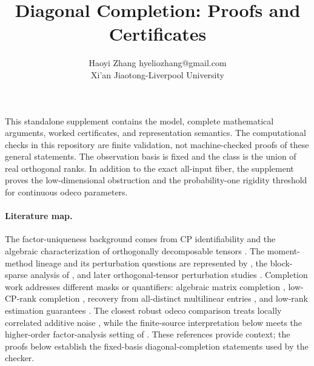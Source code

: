 \documentclass[11pt,twoside]{article}
\begin{document}
\title{Diagonal Completion: Proofs and Certificates}
\author{\name Haoyi Zhang \email hyeliozhang@gmail.com \\
\addr Xi'an Jiaotong-Liverpool University}
\maketitle
This standalone supplement contains the model, complete mathematical arguments,
worked certificates, and representation semantics. The computational checks in
this repository are finite validation, not machine-checked proofs of these general statements.
The observation basis is fixed and the class is the union of real orthogonal ranks.  In addition to the exact all-input fiber, the supplement proves the low-dimensional obstruction and the probability-one rigidity threshold for continuous odeco parameters.

\paragraph{Literature map.}
The factor-uniqueness background comes from CP identifiability and the algebraic
characterization of orthogonally decomposable tensors
\citep{bhaskara2014,boralevi2017,robeva2016,koiran2021}.
The moment-method lineage and its perturbation questions are represented by
\citet{anandkumar2014}, the block-sparse analysis of \citet{anandkumar2016},
and later orthogonal-tensor perturbation studies
\citep{luo2021,xia2019,auddy2023,yuan2026}.
Completion work addresses different masks or quantifiers: algebraic matrix
completion \citep{kiraly2015}, low-CP-rank completion
\citep{ashraphijuo2017,haselby2024}, recovery from all-distinct multilinear
entries \citep{schramm2015}, and low-rank estimation guarantees
\citep{tongwu2026}. The closest robust odeco comparison treats locally
correlated additive noise \citep{mickelin2023}, while the finite-source
interpretation below meets the higher-order factor-analysis setting of
\citet{ardiyansyah2023}. These references provide context; the proofs below
establish the fixed-basis diagonal-completion statements used by the checker.







\appendix

\end{document}
